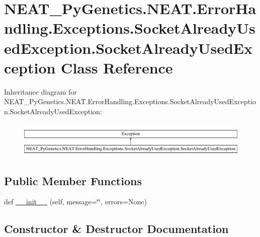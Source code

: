 \hypertarget{classNEAT__PyGenetics_1_1NEAT_1_1ErrorHandling_1_1Exceptions_1_1SocketAlreadyUsedException_1_1SocketAlreadyUsedException}{}\section{N\+E\+A\+T\+\_\+\+Py\+Genetics.\+N\+E\+A\+T.\+Error\+Handling.\+Exceptions.\+Socket\+Already\+Used\+Exception.\+Socket\+Already\+Used\+Exception Class Reference}
\label{classNEAT__PyGenetics_1_1NEAT_1_1ErrorHandling_1_1Exceptions_1_1SocketAlreadyUsedException_1_1SocketAlreadyUsedException}
Inheritance diagram for N\+E\+A\+T\+\_\+\+Py\+Genetics.\+N\+E\+A\+T.\+Error\+Handling.\+Exceptions.\+Socket\+Already\+Used\+Exception.\+Socket\+Already\+Used\+Exception\+:\begin{figure}[H]
\begin{center}
\leavevmode
\includegraphics[height=1.723077cm]{classNEAT__PyGenetics_1_1NEAT_1_1ErrorHandling_1_1Exceptions_1_1SocketAlreadyUsedException_1_1SocketAlreadyUsedException}
\end{center}
\end{figure}
\subsection*{Public Member Functions}
\begin{DoxyCompactItemize}
\item 
def \hyperlink{classNEAT__PyGenetics_1_1NEAT_1_1ErrorHandling_1_1Exceptions_1_1SocketAlreadyUsedException_1_1SocketAlreadyUsedException_aa78052a441ad0d25947f06f3ed625c1c}{\+\_\+\+\_\+init\+\_\+\+\_\+} (self, message=\char`\"{}\char`\"{}, errors=None)
\end{DoxyCompactItemize}


\subsection{Constructor \& Destructor Documentation}

